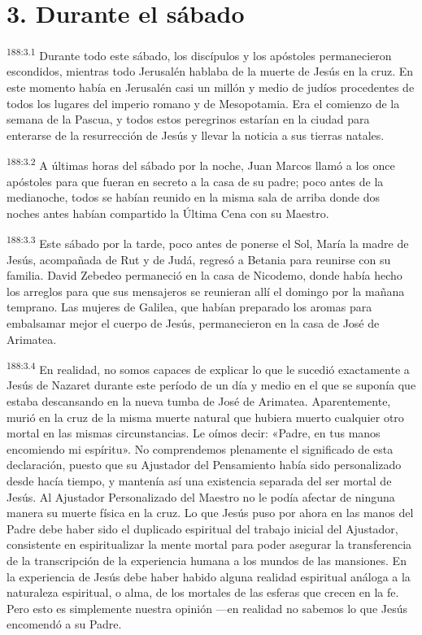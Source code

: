 \section*{3. Durante el sábado}
\par 
\textsuperscript{188:3.1} Durante todo este sábado, los discípulos y los apóstoles permanecieron escondidos, mientras todo Jerusalén hablaba de la muerte de Jesús en la cruz. En este momento había en Jerusalén casi un millón y medio de judíos procedentes de todos los lugares del imperio romano y de Mesopotamia. Era el comienzo de la semana de la Pascua, y todos estos peregrinos estarían en la ciudad para enterarse de la resurrección de Jesús y llevar la noticia a sus tierras natales.

\par 
\textsuperscript{188:3.2} A últimas horas del sábado por la noche, Juan Marcos llamó a los once apóstoles para que fueran en secreto a la casa de su padre; poco antes de la medianoche, todos se habían reunido en la misma sala de arriba donde dos noches antes habían compartido la Última Cena con su Maestro.

\par 
\textsuperscript{188:3.3} Este sábado por la tarde, poco antes de ponerse el Sol, María la madre de Jesús, acompañada de Rut y de Judá, regresó a Betania para reunirse con su familia. David Zebedeo permaneció en la casa de Nicodemo, donde había hecho los arreglos para que sus mensajeros se reunieran allí el domingo por la mañana temprano. Las mujeres de Galilea, que habían preparado los aromas para embalsamar mejor el cuerpo de Jesús, permanecieron en la casa de José de Arimatea.

\par 
\textsuperscript{188:3.4} En realidad, no somos capaces de explicar lo que le sucedió exactamente a Jesús de Nazaret durante este período de un día y medio en el que se suponía que estaba descansando en la nueva tumba de José de Arimatea. Aparentemente, murió en la cruz de la misma muerte natural que hubiera muerto cualquier otro mortal en las mismas circunstancias. Le oímos decir: «Padre, en tus manos encomiendo mi espíritu». No comprendemos plenamente el significado de esta declaración, puesto que su Ajustador del Pensamiento había sido personalizado desde hacía tiempo, y mantenía así una existencia separada del ser mortal de Jesús. Al Ajustador Personalizado del Maestro no le podía afectar de ninguna manera su muerte física en la cruz. Lo que Jesús puso por ahora en las manos del Padre debe haber sido el duplicado espiritual del trabajo inicial del Ajustador, consistente en espiritualizar la mente mortal para poder asegurar la transferencia de la transcripción de la experiencia humana a los mundos de las mansiones. En la experiencia de Jesús debe haber habido alguna realidad espiritual análoga a la naturaleza espiritual, o alma, de los mortales de las esferas que crecen en la fe. Pero esto es simplemente nuestra opinión ---en realidad no sabemos lo que Jesús encomendó a su Padre.


